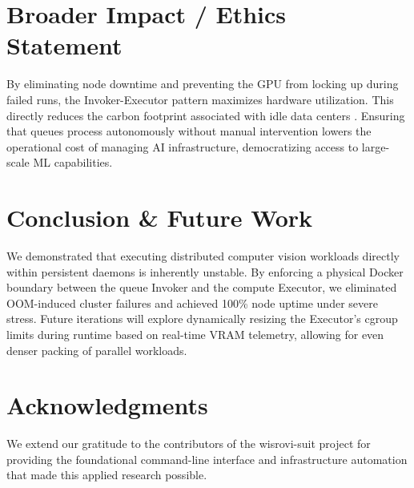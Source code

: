 \documentclass[10pt,twocolumn,letterpaper]{article}
\begin{document}
\section{Broader Impact / Ethics Statement}
By eliminating node downtime and preventing the GPU from locking up during failed runs, the Invoker-Executor pattern maximizes hardware utilization. This directly reduces the carbon footprint associated with idle data centers \cite{green2024energy}. Ensuring that queues process autonomously without manual intervention lowers the operational cost of managing AI infrastructure, democratizing access to large-scale ML capabilities.

\section{Conclusion \& Future Work}
We demonstrated that executing distributed computer vision workloads directly within persistent daemons is inherently unstable. By enforcing a physical Docker boundary between the queue Invoker and the compute Executor, we eliminated OOM-induced cluster failures and achieved 100\% node uptime under severe stress. Future iterations will explore dynamically resizing the Executor's cgroup limits during runtime based on real-time VRAM telemetry, allowing for even denser packing of parallel workloads.

\section{Acknowledgments}
We extend our gratitude to the contributors of the wisrovi-suit project for providing the foundational command-line interface and infrastructure automation that made this applied research possible.



\end{document}
